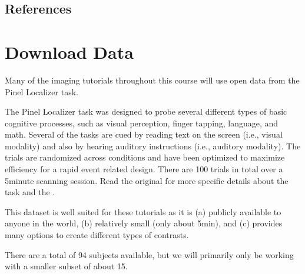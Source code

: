 \documentclass[letterpaper,10pt,english]{sphinxmanual}
\begin{document}
\subsection{References}
\label{\detokenize{content/Introduction_to_JupyterHub:references}}






\section{Download Data}
\label{\detokenize{content/Download_Data:download-data}}\label{\detokenize{content/Download_Data::doc}}

Many of the imaging tutorials throughout this course will use open data from the Pinel Localizer task.

The Pinel Localizer task was designed to probe several different types of basic cognitive processes, such as visual perception, finger tapping, language, and math. Several of the tasks are cued by reading text on the screen (i.e., visual modality) and also by hearing auditory instructions (i.e., auditory modality). The trials are randomized across conditions and have been optimized to maximize efficiency for a rapid event related design. There are 100 trials in total over a 5\sphinxhyphen{}minute scanning session. Read the original  for more specific details about the task and the .

This dataset is well suited for these tutorials as it is (a) publicly available to anyone in the world, (b) relatively small (only about 5min), and (c) provides many options to create different types of contrasts.

There are a total of 94 subjects available, but we will primarily only be working with a smaller subset of about 15.
\end{document}
